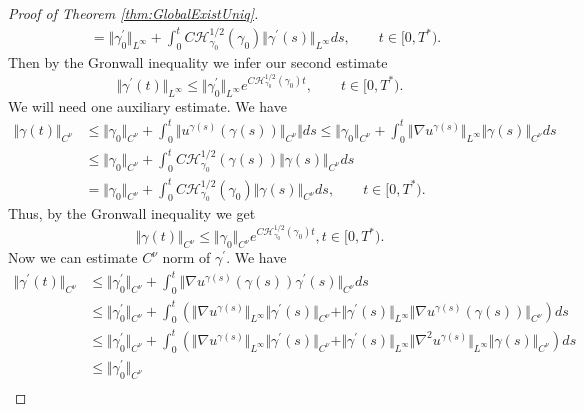 \documentclass[11pt,a4paper,reqno]{amsart}%
\theoremstyle{plain}
\theoremstyle{remark}
\theoremstyle{plain}
\numberwithin{equation}{section}
\begin{document}
\begin{proof}[Proof of Theorem \ref{thm:GlobalExistUniq}]
\begin{align}
&=\Vert \gamma^\prime_0\Vert_{L^{\infty}}+\int_0^t C\mathcal{H}_{\gamma_0}^{1/2}(\gamma_0)\Vert \gamma^\prime(s)\Vert_{L^{\infty}}ds,\qquad t\in[0,T^*).
\end{align}
Then by the Gronwall inequality we infer our second estimate
\begin{equation}
\Vert \gamma^\prime(t)\Vert_{L^{\infty}}\leq\Vert \gamma^\prime_0\Vert_{L^{\infty}}e^{C\mathcal{H}_{\gamma_0}^{1/2}(\gamma_0)t},\qquad t\in[0,T^*).\label{eqn:GEUEstim-2}
\end{equation}
We will need one auxiliary estimate. We have
\begin{align}
\Vert \gamma(t)\Vert_{C^{\nu}}&\leq\Vert \gamma_0\Vert_{C^{\nu}}+\int_0^t\Vert
u^{\gamma(s)}(\gamma(s))\Vert_{C^{\nu}}\Vert ds
\leq\Vert \gamma_0\Vert_{C^{\nu}}+\int_0^t\Vert \nabla
u^{\gamma(s)}\Vert_{L^{\infty}}\Vert \gamma(s)\Vert_{C^{\nu}}ds\nonumber\\
&\leq
\Vert \gamma_0\Vert_{C^{\nu}}+\int_0^tC\mathcal{H}_{\gamma_0}^{1/2}(\gamma(s))\Vert \gamma(s)\Vert_{C^{\nu}}ds\nonumber\\
&=\Vert \gamma_0\Vert_{C^{\nu}}+\int_0^tC\mathcal{H}_{\gamma_0}^{1/2}(\gamma_0)\Vert \gamma(s)\Vert_{C^{\nu}}ds,\qquad t\in[0,T^*).
\end{align}
Thus, by the Gronwall inequality we get
\begin{equation}
\Vert \gamma(t)\Vert_{C^{\nu}}\leq\Vert \gamma_0\Vert_{C^{\nu}}e^{C\mathcal{H}_{\gamma_0}^{1/2}(\gamma_0)t},t\in[0,T^*).\label{eqn:GEUEstim-aux}
\end{equation}
Now we can estimate $C^{\nu}$ norm of $\gamma^\prime$. We have
\begin{align}
\Vert \gamma^\prime(t)\Vert_{C^{\nu}}&\leq\Vert \gamma^\prime_0\Vert_{C^{\nu}}+\int_0^t\Vert \nabla
u^{\gamma(s)}(\gamma(s))\gamma^\prime(s)\Vert_{C^{\nu}}ds\nonumber\\
&\leq \Vert \gamma^\prime_0\Vert_{C^{\nu}}+\int_0^t(\Vert \nabla
u^{\gamma(s)}\Vert_{L^{\infty}}\Vert \gamma^\prime(s)\Vert_{C^{\nu}}+\Vert \gamma^\prime(s)\Vert_{L^{\infty}}\Vert \nabla
u^{\gamma(s)}(\gamma(s))\Vert_{C^{\nu}})ds\nonumber\\
&\leq\Vert \gamma^\prime_0\Vert_{C^{\nu}}+\int_0^t(\Vert \nabla
u^{\gamma(s)}\Vert_{L^{\infty}}\Vert \gamma^\prime(s)\Vert_{C^{\nu}}+\Vert \gamma^\prime(s)\Vert_{L^{\infty}}\Vert \nabla^2
u^{\gamma(s)}\Vert_{L^{\infty}}\Vert \gamma(s)\Vert_{C^{\nu}})ds\nonumber\\
&\leq\Vert \gamma^\prime_0\Vert_{C^{\nu}}\nonumber\\

\end{align}
\end{proof}
\end{document}
